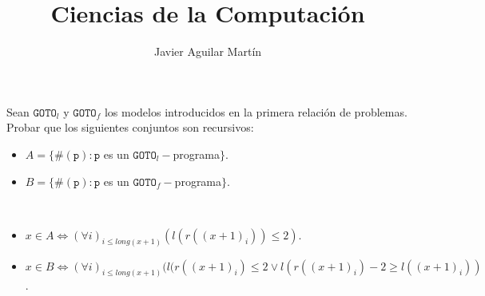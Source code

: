 \documentclass[twoside]{article}
\begin{document}
\title{Ciencias de la Computación}

\author{Javier Aguilar Martín}
\maketitle

\begin{ejercicio}{3}
Sean $\texttt{GOTO}_l$ y $\texttt{GOTO}_f$ los modelos introducidos en la primera relación de problemas.
Probar que los siguientes conjuntos son recursivos:
\begin{itemize}
\item $A = \{\#(\texttt{p}) : \texttt{p}$ es un $\texttt{GOTO}_l-$programa$\}$.
\item $B = \{\#(\texttt{p}) : \texttt{p}$ es un $\texttt{GOTO}_f-$programa$\}$.
\end{itemize}
\end{ejercicio}
\begin{solucion}\
\begin{itemize}
\item $x\in A\Leftrightarrow (\forall i)_{i\leq long(x+1)} (l(r((x+1)_i))\leq 2)$.
\item $x\in B\Leftrightarrow (\forall i)_{i\leq long(x+1)} (l(r((x+1)_i)\leq 2\lor l(r((x+1)_i)-2\geq l((x+1)_i))$.
\end{itemize}
\end{solucion}

\newpage
\end{document}

